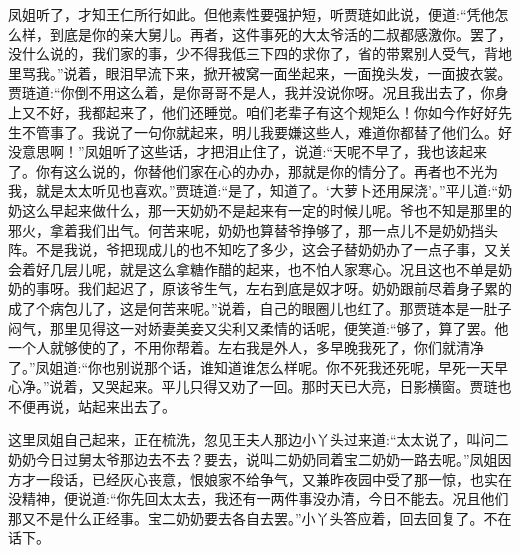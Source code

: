 \begin{parag}
    凤姐听了，才知王仁所行如此。但他素性要强护短，听贾琏如此说，便道:“凭他怎么样，到底是你的亲大舅儿。再者，这件事死的大太爷活的二叔都感激你。罢了，没什么说的，我们家的事，少不得我低三下四的求你了，省的带累别人受气，背地里骂我。”说着，眼泪早流下来，掀开被窝一面坐起来，一面挽头发，一面披衣裳。贾琏道:“你倒不用这么着，是你哥哥不是人，我并没说你呀。况且我出去了，你身上又不好，我都起来了，他们还睡觉。咱们老辈子有这个规矩么！你如今作好好先生不管事了。我说了一句你就起来，明儿我要嫌这些人，难道你都替了他们么。好没意思啊！”凤姐听了这些话，才把泪止住了，说道:“天呢不早了，我也该起来了。你有这么说的，你替他们家在心的办办，那就是你的情分了。再者也不光为我，就是太太听见也喜欢。”贾琏道:“是了，知道了。‘大萝卜还用屎浇’。”平儿道:“奶奶这么早起来做什么，那一天奶奶不是起来有一定的时候儿呢。爷也不知是那里的邪火，拿着我们出气。何苦来呢，奶奶也算替爷挣够了，那一点儿不是奶奶挡头阵。不是我说，爷把现成儿的也不知吃了多少，这会子替奶奶办了一点子事，又关会着好几层儿呢，就是这么拿糖作醋的起来，也不怕人家寒心。况且这也不单是奶奶的事呀。我们起迟了，原该爷生气，左右到底是奴才呀。奶奶跟前尽着身子累的成了个病包儿了，这是何苦来呢。”说着，自己的眼圈儿也红了。那贾琏本是一肚子闷气，那里见得这一对娇妻美妾又尖利又柔情的话呢，便笑道:“够了，算了罢。他一个人就够使的了，不用你帮着。左右我是外人，多早晚我死了，你们就清净了。”凤姐道:“你也别说那个话，谁知道谁怎么样呢。你不死我还死呢，早死一天早心净。”说着，又哭起来。平儿只得又劝了一回。那时天已大亮，日影横窗。贾琏也不便再说，站起来出去了。
\end{parag}


\begin{parag}
    这里凤姐自己起来，正在梳洗，忽见王夫人那边小丫头过来道:“太太说了，叫问二奶奶今日过舅太爷那边去不去？要去，说叫二奶奶同着宝二奶奶一路去呢。”凤姐因方才一段话，已经灰心丧意，恨娘家不给争气，又兼昨夜园中受了那一惊，也实在没精神，便说道:“你先回太太去，我还有一两件事没办清，今日不能去。况且他们那又不是什么正经事。宝二奶奶要去各自去罢。”小丫头答应着，回去回复了。不在话下。
\end{parag}


